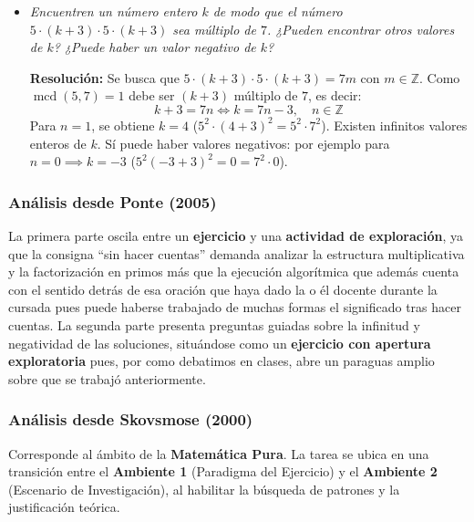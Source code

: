 \documentclass[11pt,a4paper]{article}
\begin{document}
\begin{itemize}
    \item[b)] \textit{Encuentren un número entero $k$ de modo que el número $5\cdot(k+3)\cdot 5\cdot(k+3)$ sea múltiplo de $7$. ¿Pueden encontrar otros valores de $k$? ¿Puede haber un valor negativo de $k$?}
    
    \textbf{Resolución:}
    Se busca que $5\cdot(k+3)\cdot 5\cdot(k+3) = 7m$ con $m \in \mathbb{Z}$. Como $\operatorname{mcd}(5, 7) = 1$  debe ser $(k+3)$ múltiplo de $7$, es decir:
    \[
    k + 3 = 7n \iff k = 7n - 3, \quad n \in \mathbb{Z}
    \]
    Para $n=1$, se obtiene $k=4$ ($5^2\cdot(4+3)^2 = 5^2\cdot 7^2$).
    Existen infinitos valores enteros de $k$.
    Sí puede haber valores negativos: por ejemplo para $n=0 \implies k=-3$ ($5^2(-3+3)^2=0=7^2\cdot 0$).
\end{itemize}

\subsubsection{Análisis desde Ponte (2005)}
La primera parte oscila entre un \textbf{ejercicio} y una \textbf{actividad de exploración}, ya que la consigna ``sin hacer cuentas'' demanda analizar la estructura multiplicativa y la factorización en primos más que la ejecución algorítmica que además cuenta con el sentido detrás de esa oración que haya dado la o él docente durante la cursada pues puede haberse trabajado de muchas formas el significado tras hacer cuentas. La segunda parte presenta preguntas guiadas sobre la infinitud y negatividad de las soluciones, situándose como un \textbf{ejercicio con apertura exploratoria} pues, por como debatimos en clases, abre un paraguas amplio sobre que se trabajó anteriormente.

\subsubsection{Análisis desde Skovsmose (2000)}
Corresponde al ámbito de la \textbf{Matemática Pura}. La tarea se ubica en una transición entre el \textbf{Ambiente 1} (Paradigma del Ejercicio) y el \textbf{Ambiente 2} (Escenario de Investigación), al habilitar la búsqueda de patrones y la justificación teórica.
\end{document}
